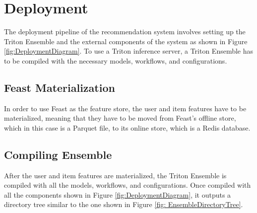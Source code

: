 \section{Deployment}

The deployment pipeline of the recommendation system involves setting up the Triton Ensemble and the external components of the system as shown in Figure \ref{fig:DeploymentDiagram}.
To use a Triton inference server, a Triton Ensemble has to be compiled with the necessary models, workflows, and configurations.

\subsection{Feast Materialization}

In order to use Feast as the feature store, the user and item features have to be materialized, 
meaning that they have to be moved from Feast's offline store, which in this case is a Parquet file, to its online store, which is a Redis database.

\subsection{Compiling Ensemble}

After the user and item features are materialized, the Triton Ensemble is compiled with all the models, workflows, and configurations.
Once compiled with all the components shown in Figure \ref{fig:DeploymentDiagram}, it outputs a directory tree similar to the one shown in Figure \ref{fig: EnsembleDirectoryTree}.

